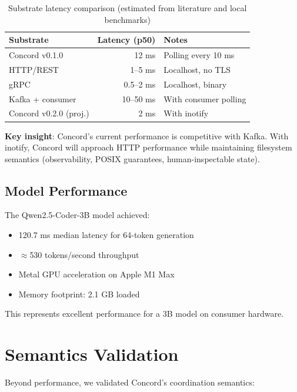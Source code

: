 \documentclass[11pt]{article}
\begin{document}
\begin{table}[h]
\centering
\begin{tabular}{lrl}
\toprule
\textbf{Substrate} & \textbf{Latency (p50)} & \textbf{Notes} \\
\midrule
Concord v0.1.0 & 12 ms & Polling every 10 ms \\
HTTP/REST & 1--5 ms & Localhost, no TLS \\
gRPC & 0.5--2 ms & Localhost, binary \\
Kafka + consumer & 10--50 ms & With consumer polling \\
Concord v0.2.0 (proj.) & 2 ms & With inotify \\
\bottomrule
\end{tabular}
\caption{Substrate latency comparison (estimated from literature and local benchmarks)}
\label{tab:comparison}
\end{table}

\textbf{Key insight}: Concord's current performance is competitive with Kafka. With inotify, Concord will approach HTTP performance while maintaining filesystem semantics (observability, POSIX guarantees, human-inspectable state).

\subsection{Model Performance}

The Qwen2.5-Coder-3B model achieved:
\begin{itemize}
\item 120.7 ms median latency for 64-token generation
\item $\approx$530 tokens/second throughput
\item Metal GPU acceleration on Apple M1 Max
\item Memory footprint: 2.1 GB loaded
\end{itemize}

This represents excellent performance for a 3B model on consumer hardware.

\section{Semantics Validation}

Beyond performance, we validated Concord's coordination semantics:
\end{document}
